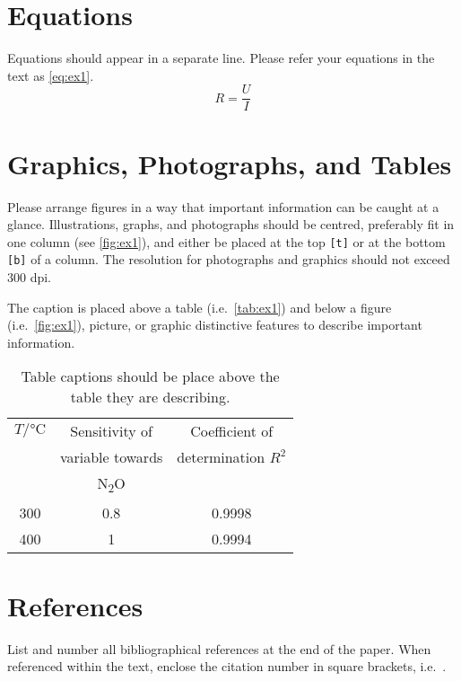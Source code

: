 \documentclass{ama}
\begin{document}
\section{Equations}
Equations should appear in a separate line.
Please refer your equations in the text as \autoref{eq:ex1}.
\begin{equation}
    R = \frac{U}{I}\label{eq:ex1}
\end{equation}

\section{Graphics, Photographs, and Tables}
Please arrange figures in a way that important information can be caught at a glance.
Illustrations, graphs, and photographs should be centred, preferably fit in one column (see \autoref{fig:ex1}), and either be placed at the top \texttt{[t]} or at the bottom \texttt{[b]} of a column.
The resolution for photographs and graphics should not exceed 300 dpi.

The caption is placed above a table (i.e.\ \autoref{tab:ex1}) and below a figure (i.e.\ \autoref{fig:ex1}), picture, or graphic distinctive features to describe important information.
%
\begin{table}[b]
    \caption{Table captions should be place above the table they are describing.}\label{tab:ex1}
    \centering
    \begin{tabular}{ccc}
        \toprule
        \(T / \si{\celsius}\) & Sensitivity of & Coefficient of \\
        & variable towards & determination \(R^2\)  \\
        & N\textsubscript{2}O & \\
        \midrule
        \num{300} & \num{0.8} & \num{0.9998} \\
        \midrule
        \num{400} & \num{1} & \num{0.9994} \\
        \bottomrule
    \end{tabular}
\end{table}

\section{References}
List and number all bibliographical references at the end of the paper.
When referenced within the text, enclose the citation number in square brackets, i.e.~\cite{mouse2011}.

\printbibliography{}
\end{document}
